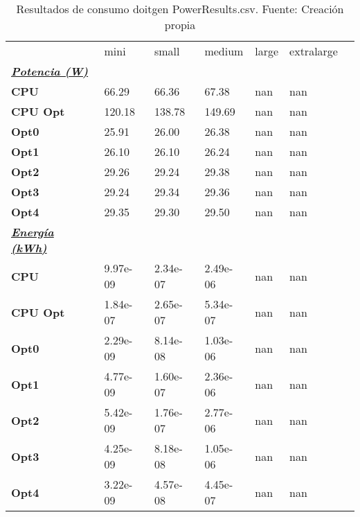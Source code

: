 \begin{table}[H]
    \centering
    \begin{tabular}{lllllll}
    \rowcolor[HTML]{DAE8FC} \ & mini & small & medium & 	large & 	extralarge \\
    \cellcolor[HTML]{DAE8FC} \textbf{\textbf{{\emph{{\underline{{Potencia (W)}}}}}}} &  &  &  & 	 & 	 \\
    \rowcolor[HTML]{EFEFEF} \cellcolor[HTML]{DAE8FC} \textbf{CPU} & 66.29 & 66.36 & 67.38 & 	nan & 	nan \\
    \cellcolor[HTML]{DAE8FC} \textbf{CPU Opt} & 120.18 & 138.78 & 149.69 & 	nan & 	nan \\
    \rowcolor[HTML]{EFEFEF} \cellcolor[HTML]{DAE8FC} \textbf{Opt0} & 25.91 & 26.00 & 26.38 & 	nan & 	nan \\
    \cellcolor[HTML]{DAE8FC} \textbf{Opt1} & 26.10 & 26.10 & 26.24 & 	nan & 	nan \\
    \rowcolor[HTML]{EFEFEF} \cellcolor[HTML]{DAE8FC} \textbf{Opt2} & 29.26 & 29.24 & 29.38 & 	nan & 	nan \\
    \cellcolor[HTML]{DAE8FC} \textbf{Opt3} & 29.24 & 29.34 & 29.36 & 	nan & 	nan \\
    \rowcolor[HTML]{EFEFEF} \cellcolor[HTML]{DAE8FC} \textbf{Opt4} & 29.35 & 29.30 & 29.50 & 	nan & 	nan \\
    \cellcolor[HTML]{DAE8FC} \textbf{\textbf{{\emph{{\underline{{Energía (kWh)}}}}}}} &  &  &  & 	 & 	 \\
    \rowcolor[HTML]{EFEFEF} \cellcolor[HTML]{DAE8FC} \textbf{CPU} & 9.97e-09 & 2.34e-07 & 2.49e-06 & 	nan & 	nan \\
    \cellcolor[HTML]{DAE8FC} \textbf{CPU Opt} & 1.84e-07 & 2.65e-07 & 5.34e-07 & 	nan & 	nan \\
    \rowcolor[HTML]{EFEFEF} \cellcolor[HTML]{DAE8FC} \textbf{Opt0} & 2.29e-09 & 8.14e-08 & 1.03e-06 & 	nan & 	nan \\
    \cellcolor[HTML]{DAE8FC} \textbf{Opt1} & 4.77e-09 & 1.60e-07 & 2.36e-06 & 	nan & 	nan \\
    \rowcolor[HTML]{EFEFEF} \cellcolor[HTML]{DAE8FC} \textbf{Opt2} & 5.42e-09 & 1.76e-07 & 2.77e-06 & 	nan & 	nan \\
    \cellcolor[HTML]{DAE8FC} \textbf{Opt3} & 4.25e-09 & 8.18e-08 & 1.05e-06 & 	nan & 	nan \\
    \rowcolor[HTML]{EFEFEF} \cellcolor[HTML]{DAE8FC} \textbf{Opt4} & 3.22e-09 & 4.57e-08 & 4.45e-07 & 	nan & 	nan \\
    \end{tabular}
    \caption[Resultados de consumo doitgen PowerResults.csv]{{Resultados de consumo doitgen PowerResults.csv. Fuente: Creación propia}}
    \label{table_global_doitgen_PowerResults_data}
\end{table}